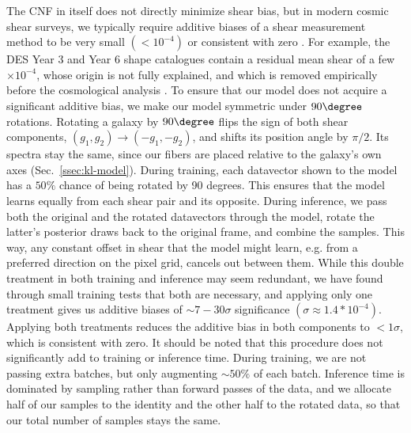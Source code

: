 The CNF in itself does not directly minimize shear bias, but in modern cosmic shear surveys, we typically require additive biases of a shear measurement method to be very small $(<10^{-4})$ or consistent with zero \citep{HSCY1Shape, DESY3Shape, HSCY3Shape, DESY6Shape}. For example, the DES Year 3 and Year 6 shape catalogues contain a residual mean shear of a few $\times10^{-4}$, whose origin is not fully explained, and which is removed empirically before the cosmological analysis \citep{DESY3CosmicShear, DESY6Shape}. To ensure that our model does not acquire a significant additive bias, we make our model symmetric under $90\degree$ rotations. Rotating a galaxy by $90\degree$ flips the sign of both shear components, $(g_1, g_2) \rightarrow (-g_1, -g_2)$, and shifts its position angle by $\pi/2$. Its spectra stay the same, since our fibers are placed relative to the galaxy's own axes (Sec.~\ref{ssec:kl-model}). During training, each datavector shown to the model has a $50\%$ chance of being rotated by 90 degrees. This ensures that the model learns equally from each shear pair and its opposite. During inference, we pass both the original and the rotated datavectors through the model, rotate the latter's posterior draws back to the original frame, and combine the samples. This way, any constant offset in shear that the model might learn, e.g. from a preferred direction on the pixel grid, cancels out between them. While this double treatment in both training and inference may seem redundant, we have found through small training tests that both are necessary, and applying only one treatment gives us additive biases of $\sim7-30 \sigma$ significance $(\sigma\approx1.4*10^{-4})$. Applying both treatments reduces the additive bias in both components to $<1\sigma$, which is consistent with zero. It should be noted that this procedure does not significantly add to training or inference time. During training, we are not passing extra batches, but only augmenting $\sim50\%$ of each batch. Inference time is dominated by sampling rather than forward passes of the data, and we allocate half of our samples to the identity and the other half to the rotated data, so that our total number of samples stays the same.

